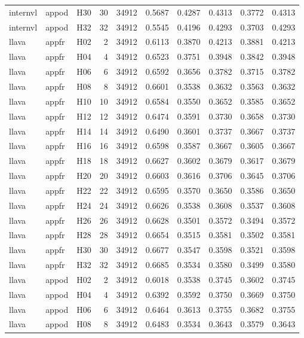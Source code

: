 \begin{table}[tbp]
\begin{tabular}{lllrrrrrrr}
internvl & appod & H30 & 30 & 34912 & 0.5687 & 0.4287 & 0.4313 & 0.3772 & 0.4313 \\
internvl & appod & H32 & 32 & 34912 & 0.5545 & 0.4196 & 0.4293 & 0.3703 & 0.4293 \\
llava & appfr & H02 & 2 & 34912 & 0.6113 & 0.3870 & 0.4213 & 0.3881 & 0.4213 \\
llava & appfr & H04 & 4 & 34912 & 0.6523 & 0.3751 & 0.3948 & 0.3842 & 0.3948 \\
llava & appfr & H06 & 6 & 34912 & 0.6592 & 0.3656 & 0.3782 & 0.3715 & 0.3782 \\
llava & appfr & H08 & 8 & 34912 & 0.6601 & 0.3538 & 0.3632 & 0.3563 & 0.3632 \\
llava & appfr & H10 & 10 & 34912 & 0.6584 & 0.3550 & 0.3652 & 0.3585 & 0.3652 \\
llava & appfr & H12 & 12 & 34912 & 0.6474 & 0.3591 & 0.3730 & 0.3658 & 0.3730 \\
llava & appfr & H14 & 14 & 34912 & 0.6490 & 0.3601 & 0.3737 & 0.3667 & 0.3737 \\
llava & appfr & H16 & 16 & 34912 & 0.6598 & 0.3587 & 0.3667 & 0.3605 & 0.3667 \\
llava & appfr & H18 & 18 & 34912 & 0.6627 & 0.3602 & 0.3679 & 0.3617 & 0.3679 \\
llava & appfr & H20 & 20 & 34912 & 0.6603 & 0.3616 & 0.3706 & 0.3645 & 0.3706 \\
llava & appfr & H22 & 22 & 34912 & 0.6595 & 0.3570 & 0.3650 & 0.3586 & 0.3650 \\
llava & appfr & H24 & 24 & 34912 & 0.6626 & 0.3538 & 0.3608 & 0.3537 & 0.3608 \\
llava & appfr & H26 & 26 & 34912 & 0.6628 & 0.3501 & 0.3572 & 0.3494 & 0.3572 \\
llava & appfr & H28 & 28 & 34912 & 0.6654 & 0.3515 & 0.3581 & 0.3502 & 0.3581 \\
llava & appfr & H30 & 30 & 34912 & 0.6677 & 0.3547 & 0.3598 & 0.3521 & 0.3598 \\
llava & appfr & H32 & 32 & 34912 & 0.6685 & 0.3534 & 0.3580 & 0.3499 & 0.3580 \\
llava & appod & H02 & 2 & 34912 & 0.6018 & 0.3538 & 0.3745 & 0.3602 & 0.3745 \\
llava & appod & H04 & 4 & 34912 & 0.6392 & 0.3592 & 0.3750 & 0.3669 & 0.3750 \\
llava & appod & H06 & 6 & 34912 & 0.6464 & 0.3613 & 0.3755 & 0.3682 & 0.3755 \\
llava & appod & H08 & 8 & 34912 & 0.6483 & 0.3534 & 0.3643 & 0.3579 & 0.3643 \\

\end{tabular}
\end{table}
